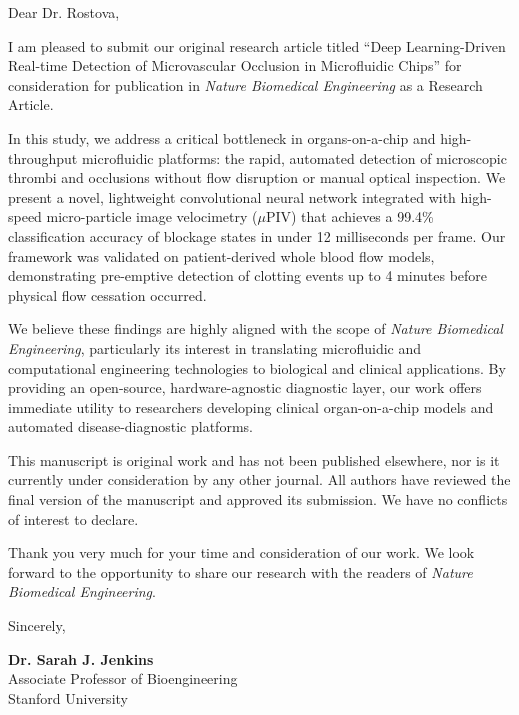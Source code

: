 \documentclass[11pt, a4paper]{article}
\begin{document}
Dear Dr. Rostova,

\vspace{0.5em}

I am pleased to submit our original research article titled ``Deep Learning-Driven Real-time Detection of Microvascular Occlusion in Microfluidic Chips'' for consideration for publication in \textit{Nature Biomedical Engineering} as a Research Article.

\vspace{0.6em}

In this study, we address a critical bottleneck in organs-on-a-chip and high-throughput microfluidic platforms: the rapid, automated detection of microscopic thrombi and occlusions without flow disruption or manual optical inspection. We present a novel, lightweight convolutional neural network integrated with high-speed micro-particle image velocimetry ($\mu$PIV) that achieves a 99.4\% classification accuracy of blockage states in under 12 milliseconds per frame. Our framework was validated on patient-derived whole blood flow models, demonstrating pre-emptive detection of clotting events up to 4 minutes before physical flow cessation occurred.

\vspace{0.6em}

We believe these findings are highly aligned with the scope of \textit{Nature Biomedical Engineering}, particularly its interest in translating microfluidic and computational engineering technologies to biological and clinical applications. By providing an open-source, hardware-agnostic diagnostic layer, our work offers immediate utility to researchers developing clinical organ-on-a-chip models and automated disease-diagnostic platforms.

\vspace{0.6em}

This manuscript is original work and has not been published elsewhere, nor is it currently under consideration by any other journal. All authors have reviewed the final version of the manuscript and approved its submission. We have no conflicts of interest to declare.

\vspace{0.6em}

Thank you very much for your time and consideration of our work. We look forward to the opportunity to share our research with the readers of \textit{Nature Biomedical Engineering}.

\vspace{1.0em}

Sincerely,

\vspace{1.5em}

\textbf{Dr. Sarah J. Jenkins} \\
Associate Professor of Bioengineering \\
Stanford University
\end{document}
